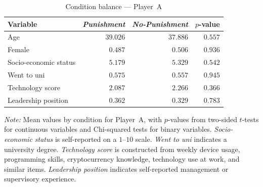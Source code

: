 \begin{table}[!htbp]
    \centering
    \caption{Condition balance --- Player~A}
    \label{tab:treatment_balance}
    \begin{tabular}{l|rrr}
                  Variable &  \textit{Punishment} &  \textit{No-Punishment} &  $p$-value \\ \hline
                           Age &  $39.026$ &  $37.886$ &  $0.557$ \\
                        Female &  $0.487$ &  $0.506$ &  $0.936$ \\
         Socio-economic status &  $5.179$ &  $5.329$ &  $0.542$ \\
                   Went to uni &  $0.575$ &  $0.557$ &  $0.945$ \\
              Technology score &  $2.087$ &  $2.266$ &  $0.366$ \\
           Leadership position &  $0.362$ &  $0.329$ &  $0.783$ \\
    \end{tabular}
    \begin{minipage}{0.95\textwidth}\footnotesize
    \textit{Note:} Mean values by condition for Player~A, with $p$-values from two-sided $t$-tests for continuous variables and Chi-squared tests for binary variables. \textit{Socio-economic status} is self-reported on a $1$--$10$ scale. \textit{Went to uni} indicates a university degree. \textit{Technology score} is constructed from weekly device usage, programming skills, cryptocurrency knowledge, technology use at work, and similar items. \textit{Leadership position} indicates self-reported management or supervisory experience.
    \end{minipage}
\end{table}
